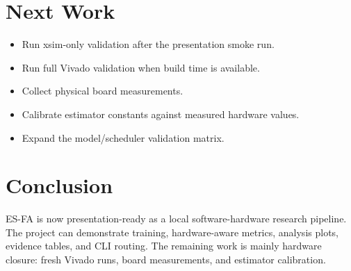 \documentclass[11pt]{article}
\begin{document}
\section{Next Work}
\begin{itemize}
\item Run xsim-only validation after the presentation smoke run.
\item Run full Vivado validation when build time is available.
\item Collect physical board measurements.
\item Calibrate estimator constants against measured hardware values.
\item Expand the model/scheduler validation matrix.
\end{itemize}

\section{Conclusion}
ES-FA is now presentation-ready as a local software-hardware research pipeline.
The project can demonstrate training, hardware-aware metrics, analysis plots,
evidence tables, and CLI routing. The remaining work is mainly hardware closure:
fresh Vivado runs, board measurements, and estimator calibration.
\end{document}
